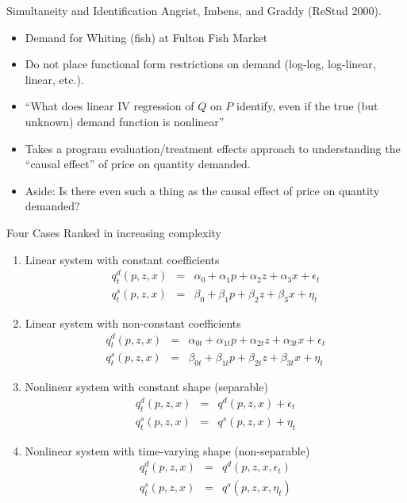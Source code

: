 \begin{frame}{Simultaneity and Identification}
Angrist, Imbens, and Graddy (ReStud 2000).
\begin{itemize}
\item Demand for Whiting (fish) at Fulton Fish Market
\item Do not place functional form restrictions on demand (log-log, log-linear, linear, etc.).
\item ``What does linear IV regression of $Q$ on $P$ identify, even if the true (but unknown) demand function is nonlinear''
\item Takes a program evaluation/treatment effects approach to understanding the ``causal effect'' of price on quantity demanded.
\item Aside: Is there even such a thing as the causal effect of price on quantity demanded?
\end{itemize}
\end{frame}

\begin{frame}{Four Cases}
Ranked in increasing complexity
\footnotesize
\begin{enumerate}
\item Linear system with constant coefficients
\begin{eqnarray*}
q_t^d(p,z,x) &=& \alpha_0 + \alpha_1 p + \alpha_2 z + \alpha_3 x + \epsilon_t \\
q_t^s(p,z,x) &=& \beta_0 + \beta_1 p + \beta_2 z + \beta_3 x + \eta_t
\end{eqnarray*}
\item Linear system with non-constant coefficients
\begin{eqnarray*}
q_t^d(p,z,x) &=& \alpha_{0t} + \alpha_{1t} p + \alpha_{2t} z + \alpha_{3t} x + \epsilon_t \\
q_t^s(p,z,x) &=& \beta_{0t} + \beta_{1t} p + \beta_{2t} z + \beta_{3t} x + \eta_t
\end{eqnarray*}
\item Nonlinear system with constant shape (separable)
\begin{eqnarray*}
q_t^d(p,z,x) &=& q^d(p,z,x)+ \epsilon_t \\
q_t^s(p,z,x) &=& q^s(p,z,x)+ \eta_t
\end{eqnarray*}
\item Nonlinear system with time-varying shape (non-separable)
\begin{eqnarray*}
q_t^d(p,z,x) &=& q^d(p,z,x,\epsilon_t) \\
q_t^s(p,z,x) &=& q^s(p,z,x,\eta_t)
\end{eqnarray*}
\end{enumerate}
\end{frame}

